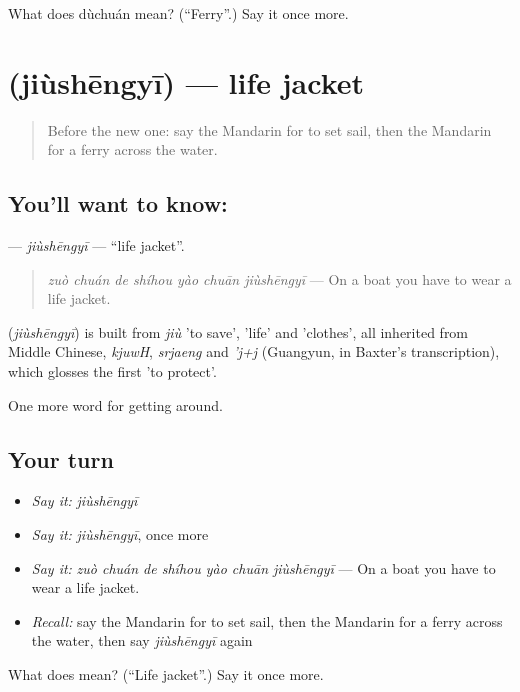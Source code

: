 \begin{tcolorbox}[breakable,colback=teal!4,colframe=teal!35!black,title={Before you move on}]
What does dùchuán mean? (\textquotedblleft{}Ferry\textquotedblright{}.) Say it once more.
\end{tcolorbox}
\section[\texorpdfstring{\zh{救生衣} (jiùshēngyī)}{救生衣 (jiùshēngyī)}]{ (jiùshēngyī) — life jacket}

\label{lesson:ZH-C411-jiushengyi}



\begin{quote}
Before the new one: say the Mandarin for to set sail, then the Mandarin for a ferry across the water.
\end{quote}

\subsection*{You'll want to know: }
\textbf{} — \emph{jiùshēngyī} — \textquotedblleft{}life jacket\textquotedblright{}.

\begin{quote}
\emph{zuò chuán de shíhou yào chuān jiùshēngyī} — On a boat you have to wear a life jacket.
\end{quote}

\begin{cousinweb}
\textbf{} (\emph{jiùshēngyī}) is built from \emph{jiù} 'to save',  'life' and  'clothes', all inherited from Middle Chinese, \emph{kjuwH}, \emph{srjaeng} and \emph{'j+j} (Guangyun, in Baxter's transcription), which glosses the first 'to protect'.
\end{cousinweb}

\begin{grammarlens}[title={What you've built}]
One more word for getting around.
\end{grammarlens}

\subsection*{Your turn}
\begin{itemize}
\raggedright
  \item \emph{Say it:} \emph{jiùshēngyī}
  \item \emph{Say it:} \emph{jiùshēngyī}, once more
  \item \emph{Say it:} \emph{zuò chuán de shíhou yào chuān jiùshēngyī} — On a boat you have to wear a life jacket.
  \item \emph{Recall:} say the Mandarin for to set sail, then the Mandarin for a ferry across the water, then say \emph{jiùshēngyī} again
\end{itemize}

\begin{tcolorbox}[breakable,colback=teal!4,colframe=teal!35!black,title={Before you move on}]
What does  mean? (\textquotedblleft{}Life jacket\textquotedblright{}.) Say it once more.
\end{tcolorbox}
